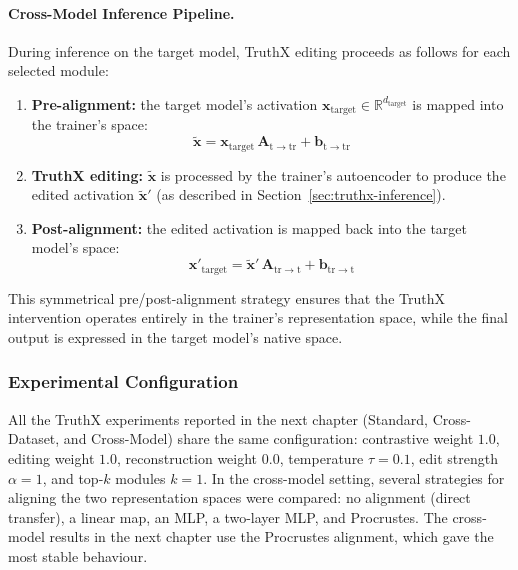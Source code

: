 \paragraph{Cross-Model Inference Pipeline.}
During inference on the target model, TruthX editing proceeds as follows for each selected module:
\begin{enumerate}
    \item \textbf{Pre-alignment:} the target model's activation $\mathbf{x}_{\mathrm{target}} \in \mathbb{R}^{d_{\mathrm{target}}}$ is mapped into the trainer's space:
    \begin{equation}
    \label{eq:prealignment}
    \tilde{\mathbf{x}} = \mathbf{x}_{\mathrm{target}}\,\mathbf{A}_{\mathrm{t \to tr}} + \mathbf{b}_{\mathrm{t \to tr}}
    \end{equation}
    \item \textbf{TruthX editing:} $\tilde{\mathbf{x}}$ is processed by the trainer's autoencoder to produce the edited activation $\tilde{\mathbf{x}}'$ (as described in Section~\ref{sec:truthx-inference}).
    \item \textbf{Post-alignment:} the edited activation is mapped back into the target model's space:
    \begin{equation}
    \label{eq:postalignment}
    \mathbf{x}'_{\mathrm{target}} = \tilde{\mathbf{x}}'\,\mathbf{A}_{\mathrm{tr \to t}} + \mathbf{b}_{\mathrm{tr \to t}}
    \end{equation}
\end{enumerate}
This symmetrical pre/post-alignment strategy ensures that the TruthX intervention operates entirely in the trainer's representation space, while the final output is expressed in the target model's native space.

\subsubsection{Experimental Configuration}
\label{sec:truthx-experimental-config}

All the TruthX experiments reported in the next chapter (Standard, Cross-Dataset, and Cross-Model) share the same configuration: contrastive weight $1.0$, editing weight $1.0$, reconstruction weight $0.0$, temperature $\tau = 0.1$, edit strength $\alpha = 1$, and top-$k$ modules $k = 1$. In the cross-model setting, several strategies for aligning the two representation spaces were compared: no alignment (direct transfer), a linear map, an MLP, a two-layer MLP, and Procrustes. The cross-model results in the next chapter use the Procrustes alignment, which gave the most stable behaviour.


